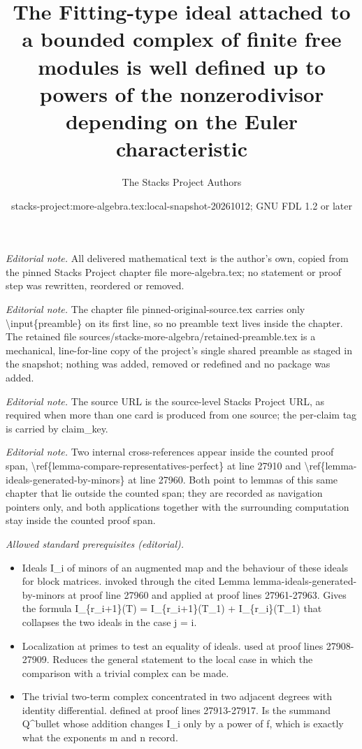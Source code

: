\documentclass[10pt,a4paper]{amsart}
\title{The Fitting-type ideal attached to a bounded complex of finite free modules is well defined up to powers of the nonzerodivisor depending on the Euler characteristic}
\author{The Stacks Project Authors}
\date{stacks-project:more-algebra.tex:local-snapshot-20261012; GNU FDL 1.2 or later}
\theoremstyle{plain}
\theoremstyle{definition}
\theoremstyle{remark}
\numberwithin{equation}{subsection}
\begin{document}
\maketitle
\setcounter{subsection}{1}
\noindent\textit{Editorial note.} All delivered mathematical text is the author's own, copied from the pinned Stacks Project chapter file more-algebra.tex; no statement or proof step was rewritten, reordered or removed.\par\medskip
\noindent\textit{Editorial note.} The chapter file pinned-original-source.tex carries only \textbackslash{}input\{preamble\} on its first line, so no preamble text lives inside the chapter. The retained file sources/stacks-more-algebra/retained-preamble.tex is a mechanical, line-for-line copy of the project's single shared preamble as staged in the snapshot; nothing was added, removed or redefined and no package was added.\par\medskip
\noindent\textit{Editorial note.} The source URL is the source-level Stacks Project URL, as required when more than one card is produced from one source; the per-claim tag is carried by claim\_key.\par\medskip
\noindent\textit{Editorial note.} Two internal cross-references appear inside the counted proof span, \textbackslash{}ref\{lemma-compare-representatives-perfect\} at line 27910 and \textbackslash{}ref\{lemma-ideals-generated-by-minors\} at line 27960. Both point to lemmas of this same chapter that lie outside the counted span; they are recorded as navigation pointers only, and both applications together with the surrounding computation stay inside the counted proof span.\par\medskip
\noindent\textit{Allowed standard prerequisites (editorial).}\begin{itemize}
\item Ideals I\_i of minors of an augmented map and the behaviour of these ideals for block matrices. invoked through the cited Lemma lemma-ideals-generated-by-minors at proof line 27960 and applied at proof lines 27961-27963. Gives the formula I\_\{r\_i+1\}(T) = I\_\{r\_i+1\}(T\_1) + I\_\{r\_i\}(T\_1) that collapses the two ideals in the case j = i.
\item Localization at primes to test an equality of ideals. used at proof lines 27908-27909. Reduces the general statement to the local case in which the comparison with a trivial complex can be made.
\item The trivial two-term complex concentrated in two adjacent degrees with identity differential. defined at proof lines 27913-27917. Is the summand Q\textasciicircum{}bullet whose addition changes I\_i only by a power of f, which is exactly what the exponents m and n record.
\end{itemize}\medskip
\end{document}
